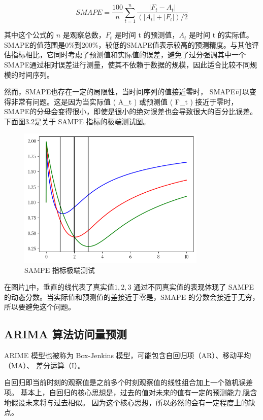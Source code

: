 \begin{equation}
  SMAPE={\frac{100}{n}}\sum_{t=1}^{n}{\frac{|F_{t}-A_{t}|}{(|A_{t}|+|F_{t}|)/2}}
\end{equation}

其中这个公式的 $n$ 是观察总数，$F_t$ 是时间 t 的预测值，$A_t$ 是时间 t 的实际值。
SMAPE的值范围是0\%到200\%，较低的SMAPE值表示较高的预测精度。与其他评估指标相比，它同时考虑了预测值和实际值的误差，避免了过分强调其中一个
SMAPE通过相对误差进行测量，使其不依赖于数据的规模，因此适合比较不同规模的时间序列。

然而，SMAPE也存在一定的局限性，当时间序列的值接近零时，
SMAPE可以变得非常有问题。这是因为当实际值 ( A\_t ) 或预测值 ( F\_t ) 接近于零时，SMAPE的分母会变得很小，即使是很小的绝对误差也会导致很大的百分比误差。下面图3.2是关于 SAMPE 指标的极端测试图。

\begin{figure}
  \centering
  \includegraphics[width=0.8\textwidth]{figures/sampe_external.png}
  \caption{SAMPE 指标极端测试}
  \label{sampe-property}
\end{figure}

在图片\ref{sampe-property}中，垂直的线代表了真实值$1 , 2, 3$ 通过不同真实值的表现体现了 SAMPE 的动态分数。当实际值和预测值的差接近于零是，SMAPE 的分数会接近于无穷，所以要避免这个问题。

\subsection{ARIMA 算法访问量预测}

ARIME 模型也被称为 Box-Jenkins 模型，可能包含自回归项（AR）、移动平均（MA）、
差分运算（I）。

自回归即当前时刻的观察值是之前多个时刻观察值的线性组合加上一个随机误差项。
基本上，自回归的核心思想是，过去的值对未来的值有一定的预测能力,隐含地假设未来将与过去相似。
因为这个核心思想，所以必然的会有一定程度上的缺点。

